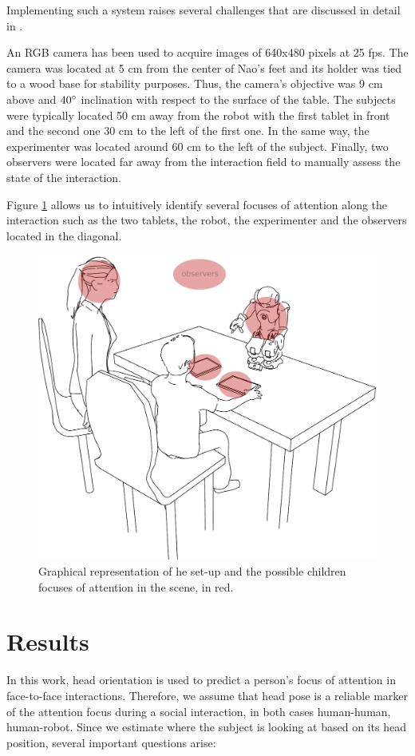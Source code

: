 \documentclass{sig-alternate}
\begin{document}
Implementing such a system raises several challenges that are discussed in detail in \cite{Hood:2015}.

An RGB camera has been used to acquire images of 640x480 pixels at 25 fps. The camera was located at 5 cm from the center of Nao's feet and its holder was tied to a wood base for stability purposes. Thus, the camera's objective was 9 cm above and $ 40\degree $ inclination with respect to the surface of the table. 
The subjects were typically located 50 cm away from the robot with the first tablet in front and the second one 30 cm to the left of the first one. In the same way, the experimenter was located around 60 cm to the left of the subject. Finally, two observers were located far away from the interaction field to manually assess the state of the interaction.

Figure \ref{drawSetup} allows us to intuitively identify several focuses of attention along the interaction such as the two tablets, the robot, the experimenter and the observers located in the diagonal.

\begin{figure}
    \centering
    \includegraphics[width=0.7\columnwidth]{drawSetup}
    \caption{\small Graphical representation of he set-up and the possible children focuses of attention in the scene, in red.}
    \label{drawSetup}
\end{figure}


\section{Results}

In this work, head orientation is used to predict a person's focus of attention in face-to-face interactions. Therefore, we assume that head pose is a reliable marker of the attention focus during a social interaction, in both cases human-human, human-robot. Since we estimate where the subject is looking at based on its head position, several important questions arise:
\end{document}
